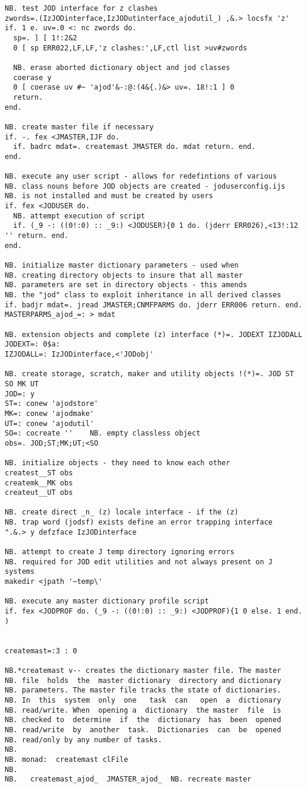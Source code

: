 \begin{lstlisting}[frame=single,framerule=0pt,basicstyle=\ttfamily\tiny]
NB. test JOD interface for z clashes
zwords=.(IzJODinterface,IzJODutinterface_ajodutil_) ,&.> locsfx 'z'
if. 1 e. uv=.0 <: nc zwords do.
  sp=. ] [ 1!:2&2
  0 [ sp ERR022,LF,LF,'z clashes:',LF,ctl list >uv#zwords

  NB. erase aborted dictionary object and jod classes
  coerase y
  0 [ coerase uv #~ 'ajod'&-:@:(4&{.)&> uv=. 18!:1 ] 0
  return.
end.

NB. create master file if necessary
if. -. fex <JMASTER,IJF do.
  if. badrc mdat=. createmast JMASTER do. mdat return. end.
end.

NB. execute any user script - allows for redefintions of various
NB. class nouns before JOD objects are created - joduserconfig.ijs
NB. is not installed and must be created by users
if. fex <JODUSER do. 
  NB. attempt execution of script
  if. (_9 -: ((0!:0) :: _9:) <JODUSER){0 1 do. (jderr ERR026),<13!:12 '' return. end.
end.

NB. initialize master dictionary parameters - used when
NB. creating directory objects to insure that all master
NB. parameters are set in directory objects - this amends
NB. the "jod" class to exploit inheritance in all derived classes
if. badjr mdat=. jread JMASTER;CNMFPARMS do. jderr ERR006 return. end.
MASTERPARMS_ajod_=: > mdat

NB. extension objects and complete (z) interface (*)=. JODEXT IZJODALL
JODEXT=: 0$a:
IZJODALL=: IzJODinterface,<'JODobj' 

NB. create storage, scratch, maker and utility objects !(*)=. JOD ST SO MK UT
JOD=: y
ST=: conew 'ajodstore'
MK=: conew 'ajodmake'
UT=: conew 'ajodutil'
SO=: cocreate ''    NB. empty classless object
obs=. JOD;ST;MK;UT;<SO

NB. initialize objects - they need to know each other
createst__ST obs
createmk__MK obs
createut__UT obs

NB. create direct _n_ (z) locale interface - if the (z)
NB. trap word (jodsf) exists define an error trapping interface
".&.> y defzface IzJODinterface

NB. attempt to create J temp directory ignoring errors
NB. required for JOD edit utilities and not always present on J systems
makedir <jpath '~temp\'

NB. execute any master dictionary profile script
if. fex <JODPROF do. (_9 -: ((0!:0) :: _9:) <JODPROF){1 0 else. 1 end.
)


createmast=:3 : 0

NB.*createmast v-- creates the dictionary master file. The master
NB. file  holds  the  master dictionary  directory and dictionary
NB. parameters. The master file tracks the state of dictionaries.
NB. In  this  system  only  one   task  can   open  a  dictionary
NB. read/write. When  opening a  dictionary  the master  file  is
NB. checked to  determine  if  the  dictionary  has  been  opened
NB. read/write  by  another  task.  Dictionaries  can  be  opened
NB. read/only by any number of tasks.
NB.
NB. monad:  createmast clFile
NB.
NB.   createmast_ajod_  JMASTER_ajod_  NB. recreate master


\end{lstlisting}

